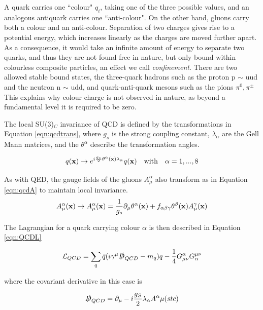 A quark carries one ``colour" $q_{i}$, taking one of the three possible values, and an analogous antiquark carries one ``anti-colour". On the other hand, gluons carry both a colour and an anti-colour.  Separation of two charges gives rise to a potential energy, which increases linearly as the charges are moved further apart. As a consequence, it would take an infinite amount of energy to separate two quarks, and thus they are not found free in nature, but only bound within colourless composite particles, an effect we call \textit{confinement}. There are two allowed stable bound states, the three-quark hadrons such as the proton p $\sim$ uud and the neutron n $\sim$ udd, and quark-anti-quark mesons such as the pions $\pi^{0}, \pi^{\pm}$ This explains why colour charge is not observed in nature, as beyond a fundamental level it is required to be zero.

The local SU(3)$_{C}$ invariance of QCD is defined by the transformations in Equation \ref{eqn:qcdtrans}, where $g_{s}$ is the strong coupling constant, $\lambda_{\alpha}$ are the Gell Mann matrices, and the $\theta^{\alpha}$ describe the transformation angles. 

\begin{equation}
q(\mathbf{x}) \rightarrow e^{i\frac{g_{s}}{2}\theta^{\alpha}(\mathbf{x}) \lambda_{\alpha}} q(\mathbf{x}) \quad \mathrm{with} \quad \alpha = 1, ... , 8
\label{eqn:qcdtrans}
\end{equation}


As with QED, the gauge fields of the gluons $A^{\alpha}_{\mu} $ also transform as in Equation \ref{eqn:qcdA} to maintain local invariance. 
\begin{equation}
A^{\alpha}_{\mu}(\mathbf{x}) \rightarrow A^{\alpha}_{\mu}(\mathbf{x}) = \frac{1}{g_{s}} \partial_{\mu}\theta^{\alpha}(\mathbf{x}) + f_{\alpha \beta \gamma}\theta^{\beta}(\mathbf{x})A^{\gamma}_{\mu}(\mathbf{x})
\label{eqn:qcdA}
\end{equation}


The Lagrangian for a quark carrying colour $\alpha$ is then described in Equation \ref{eqn:QCDL}

\begin{equation}
{\mathcal{L}}_{QCD} = \sum_{q} \bar{q}(i \gamma^{\mu}\slashed{D}_{QCD} - m_{q}) q - \frac{1}{4}G^{\alpha}_{\mu \nu}G^{\mu \nu}_{\alpha}
\label{eqn:QCDL}
\end{equation}

where the covariant derivative in this case is


\begin{equation}
\slashed{D}_{QCD} = \partial_{\mu} - i\frac{g_{S}}{2}\lambda_{\alpha}A^{\alpha}{\mu}(stc)
\label{eqn:QCDD}
\end{equation}

